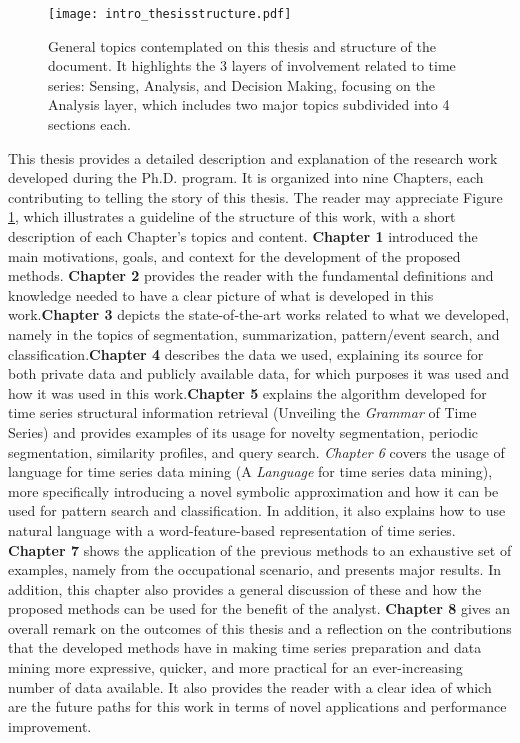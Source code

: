 \begin{figure}
\centering
\texttt{[image: intro\_thesisstructure.pdf]}
\caption{General topics contemplated on this thesis and structure of the document. It highlights the 3 layers of involvement related to time series: Sensing, Analysis, and Decision Making, focusing on the Analysis layer, which includes two major topics subdivided into 4 sections each.}
\label{fig:intro}
\end{figure}

This thesis provides a detailed description and explanation of the research work developed during the Ph.D. program. It is organized into nine Chapters, each contributing to telling the story of this thesis. The reader may appreciate Figure \ref{fig:intro}, which illustrates a guideline of the structure of this work, with a short description of each Chapter's topics and content. \textbf{Chapter 1} introduced the main motivations, goals, and context for the development of the proposed methods. \textbf{Chapter 2} provides the reader with the fundamental definitions and knowledge needed to have a clear picture of what is developed in this work.\textbf{Chapter 3} depicts the state-of-the-art works related to what we developed, namely in the topics of segmentation, summarization, pattern/event search, and classification.\textbf{Chapter 4} describes the data we used, explaining its source for both private data and publicly available data, for which purposes it was used and how it was used in this work.\textbf{Chapter 5} explains the algorithm developed for time series structural information retrieval (Unveiling the \textit{Grammar} of Time Series) and provides examples of its usage for novelty segmentation, periodic segmentation, similarity profiles, and query search. \textit{Chapter 6} covers the usage of language for time series data mining (A \textit{Language} for time series data mining), more specifically introducing a novel symbolic approximation and how it can be used for pattern search and classification. In addition, it also explains how to use natural language with a word-feature-based representation of time series. \textbf{Chapter 7} shows the application of the previous methods to an exhaustive set of examples, namely from the occupational scenario, and presents major results. In addition, this chapter also provides a general discussion of these and how the proposed methods can be used for the benefit of the analyst. \textbf{Chapter 8} gives an overall remark on the outcomes of this thesis and a reflection on the contributions that the developed methods have in making time series preparation and data mining more expressive, quicker, and more practical for an ever-increasing number of data available. It also provides the reader with a clear idea of which are the future paths for this work in terms of novel applications and performance improvement.

